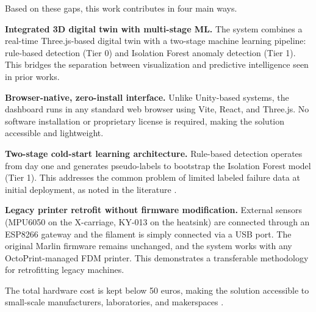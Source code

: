 Based on these gaps, this work contributes in four main ways.

\textbf{Integrated 3D digital twin with multi-stage ML.} The system combines a real-time Three.js-based digital twin with a two-stage machine learning pipeline: rule-based detection (Tier 0) and Isolation Forest anomaly detection (Tier 1). This bridges the separation between visualization and predictive intelligence seen in prior works.

\textbf{Browser-native, zero-install interface.} Unlike Unity-based systems, the dashboard runs in any standard web browser using Vite, React, and Three.js. No software installation or proprietary license is required, making the solution accessible and lightweight.

\textbf{Two-stage cold-start learning architecture.} Rule-based detection operates from day one and generates pseudo-labels to bootstrap the Isolation Forest model (Tier 1). This addresses the common problem of limited labeled failure data at initial deployment, as noted in the literature \cite{kolok2025lowcost,tudorache2025current}.

\textbf{Legacy printer retrofit without firmware modification.} External sensors (MPU6050 on the X-carriage, KY-013 on the heatsink) are connected through an ESP8266 gateway and the filament is simply connected via a USB port. The original Marlin firmware remains unchanged, and the system works with any OctoPrint-managed FDM printer. This demonstrates a transferable methodology for retrofitting legacy machines.

The total hardware cost is kept below 50 euros, making the solution accessible to small-scale manufacturers, laboratories, and makerspaces \cite{shomenov2025}.

\endinput